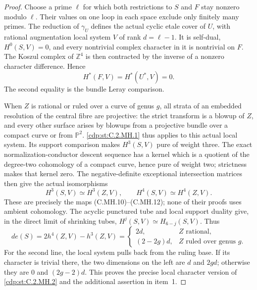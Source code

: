 \begin{proof}
Choose a prime $\ell$ for which both restrictions
to $S$ and $F$ stay nonzero modulo $\ell$.
Their values on one loop in each space exclude
only finitely many primes. The reduction of
$\gamma_U$ defines the actual cyclic etale cover
of $U$, with rational augmentation local system
$V$ of rank $d=\ell-1$. It is self-dual,
$H^0(S,V)=0$, and every nontrivial complex character
in it is nontrivial on $F$. The Koszul complex
of $\mathbb Z^4$ is then contracted by the inverse
of a nonzero character difference. Hence
\[
 H^*(F,V)=H^*(U^*,V)=0.
 \tag{C.UI.9}\label{cdp:eq:C.UI.9}
\]
The second equality is the bundle Leray comparison.

When $Z$ is rational or ruled over a curve of genus
$g$, all strata of an embedded resolution of the
central fibre are projective: the strict transform
is a blowup of $Z$, and every other surface arises
by blowups from a projective bundle over a compact
curve or from $\mathbb P^2$. \ref{cdp:st:C.2.MH.1} thus applies
to this actual local system. Its support comparison
makes $H^3(S,V)$ pure of weight three. The exact
normalization-conductor descent sequence has a
kernel which is a quotient of the degree-two
cohomology of a compact curve, hence pure of weight
two; strictness makes that kernel zero. The
negative-definite exceptional intersection matrices
then give the actual isomorphisms
\[
 H^3(S,V)\simeq H^3(Z,V),\qquad
 H^4(S,V)\simeq H^4(Z,V).
 \tag{C.UI.10}\label{cdp:eq:C.UI.10}
\]
These are precisely the maps (C.MH.10)--(C.MH.12);
none of their proofs uses ambient cohomology.
The acyclic punctured tube and local support duality
give, in the direct limit of shrinking tubes,
$H^j(S,V)\simeq H_{6-j}(S,V)$. Thus
\[
 d e(S)=2h^4(Z,V)-h^3(Z,V)
 =\begin{cases}
 2d,&Z\text{ rational},\\
 (2-2g)d,&Z\text{ ruled over genus }g.
 \end{cases}
 \tag{C.UI.11}\label{cdp:eq:C.UI.11}
\]
For the second line, the local system pulls back
from the ruling base. If its character is trivial
there, the two dimensions on the left are $d$
and $2gd$; otherwise they are $0$ and $(2g-2)d$.
This proves the precise local character version
of \ref{cdp:st:C.2.MH.2} and the additional assertion in item~1.


\end{proof}
